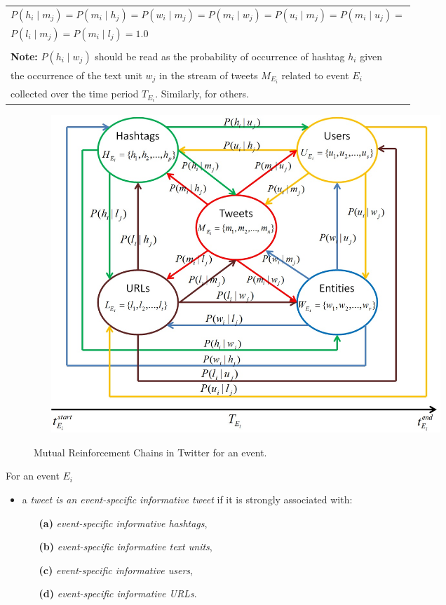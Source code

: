 \begin{table}[ht]
\begin{tabular}{|l|}
$P(h_{i} \mid m_{j}) = P(m_{i} \mid h_{j}) = P(w_{i} \mid m_{j}) = P(m_{i} \mid w_{j}) = P(u_{i} \mid m_{j}) = P(m_{i} \mid u_{j}) =$ \\ $P(l_{i} \mid m_{j})= P(m_{i} \mid l_{j})= 1.0$  \\ \\ 
\textbf{Note:} $P(h_{i} \mid w_{j})$ should be read as the probability of occurrence of hashtag $h_{i}$ given \\ the occurrence of the text unit $w_{j}$ in the stream of  tweets $M_{E_{i}}$ related to event $E_{i}$ \\ collected over the time period $T_{E_{i}}$. Similarly, for others.\\
\hline 
\end{tabular}
\end{table}


\begin{figure}[htbp]
\centering
\caption{\small Mutual Reinforcement Chains in Twitter for an event.}    
\includegraphics[width=16cm,height=12cm]{Figures/TwitterEventInfoGraph.jpg}
\label{mrc}
\end{figure}








For an event $E_{i}$ 
\begin{itemize} 
\item a \textit{tweet is an event-specific informative tweet} if it is strongly associated with:
\begin{itemize}
\item[\textbf{(a)}] \textit{event-specific informative hashtags}, 
\item[\textbf{(b)}] \textit{event-specific informative text units}, 
\item[\textbf{(c)}] \textit{event-specific informative users},
\item[\textbf{(d)}] \textit{event-specific informative URLs}. 
\end{itemize}
\end{itemize}


